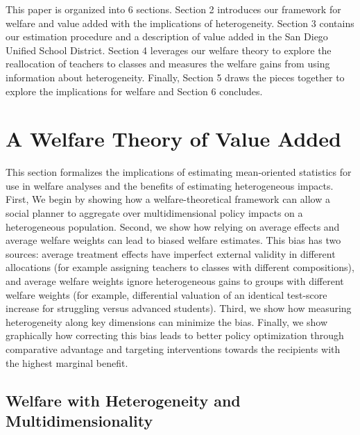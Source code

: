 \documentclass[12pt]{article}
\theoremstyle{definition}
\theoremstyle{definition}
\theoremstyle{definition}
\theoremstyle{definition}
\begin{document}


This paper is organized into 6 sections. Section 2 introduces our framework for welfare and value added with the implications of heterogeneity. Section 3 contains our estimation procedure and a description of value added in the San Diego Unified School District. Section 4 leverages our welfare theory to explore the reallocation of teachers to classes and measures the welfare gains from using information about heterogeneity. Finally, Section 5 draws the pieces together to explore the implications for welfare and Section 6 concludes.

\section{A Welfare Theory of Value Added}

This section formalizes the implications of estimating mean-oriented statistics for use in welfare analyses and the benefits of estimating heterogeneous impacts. First, We begin by showing how a welfare-theoretical framework can allow a social planner to aggregate over multidimensional policy impacts on a heterogeneous population. Second, we show how relying on average effects and average welfare weights can lead to biased welfare estimates. This bias has two sources: average treatment effects have imperfect external validity in different allocations (for example assigning teachers to classes with different compositions), and average welfare weights ignore heterogeneous gains to groups with different welfare weights (for example, differential valuation of an identical test-score increase for struggling versus advanced students). Third, we show how measuring heterogeneity along key dimensions can minimize the bias. Finally, we show graphically how correcting this bias leads to better policy optimization through comparative advantage and targeting interventions towards the recipients with the highest marginal benefit.

\subsection{Welfare with Heterogeneity and Multidimensionality}
\end{document}
